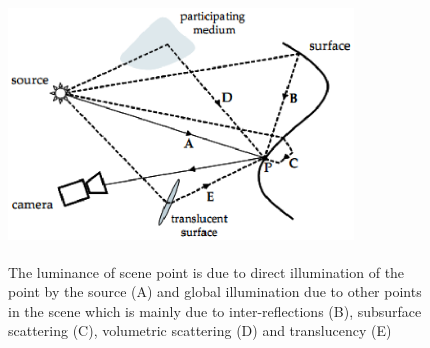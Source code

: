 \begin{figure}[t]
\centering
\includegraphics[height=2.5in,width=3.6in]{sep_images/sep2.eps}
\label{fig:15} \caption{The luminance of scene point is due to direct illumination
of the point by the source (A) and global illumination due to other
points in the scene which is mainly due to inter-reflections (B), subsurface scattering (C), volumetric scattering (D)
and translucency (E) \cite{chap3-1}
}
\end{figure}
